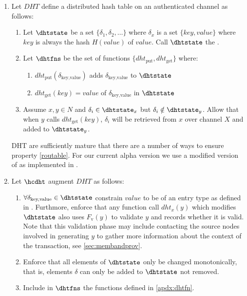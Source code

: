 \documentclass[twocolumn,showpacs,
  nofootinbib,aps,superscriptaddress,
  eqsecnum,prd,notitlepage,showkeys,10pt]{revtex4-1}
\begin{document}
\begin{enumerate}
\item Let $DHT$ define a distributed hash table on an authenticated channel as follows:
\begin{enumerate}

\item Let $\dhtstate$ be a set $\{\delta_1,\delta_2,\dots\}$ where $\delta_x$ is a set $\{key,value\}$ where $key$ is always the hash $H(value)$ of $value$.  Call $\dhtstate$ the .
\item Let $\dhtfns$ be the set of functions $\{dht_\text{put},dht_\text{get}\}$ where:
\begin{enumerate}
\item $dht_\text{put}(\delta_\text{key,value})$ adds $\delta_\text{key,value}$ to $\dhtstate$
\item $dht_\text{get}(key) = value$ of $\delta_\text{key,value}$ in $\dhtstate$
\end{enumerate}
\item \label{routable} Assume $x,y \in N$ and $\delta_i \in \dhtstate_x$ but $\delta_i \notin \dhtstate_y$. Allow that when $y$ calls $dht_\text{get}(key)$, $\delta_i$ will be retrieved from $x$ over channel $X$ and added to $\dhtstate_y$.
\end{enumerate}
DHT are sufficiently mature that there are a number of ways to ensure property \ref{routable}.  For our current alpha version we use a modified version of \cite{kademlia} as implemented in \cite{libp2p}.

\item Let $\hcdht$ augment $DHT$ as follows:
\begin{enumerate}

\item $\forall \delta_\text{key,value} \in \dhtstate$ constrain $value$ to be of an entry type as defined in \hcdna.  Furthmore, enforce that any function call $dht_x(y)$ which modifies $\dhtstate$ also uses $F_\mathrm{v}(y)$ to validate $y$ and records whether it is valid.  Note that this validation phase may include contacting the source nodes involved in generating $y$ to gather more information about the context of the transaction, see \ref{sec:membandprov}.

\item Enforce that all elements of $\dhtstate$ only be changed monotonically, that is, elements $\delta$ can only be added to $\dhtstate$ not removed.

\item Include in $\dhtfns$ the functions defined in \ref{apdx:dhtfn}.


\end{enumerate}
\end{enumerate}
\end{document}
